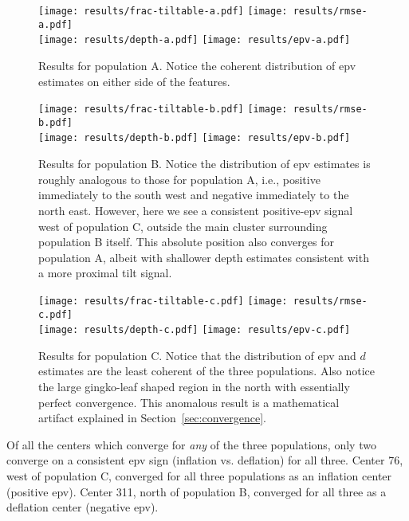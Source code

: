 \begin{figure}
    \texttt{[image: results/frac-tiltable-a.pdf]}%
    \texttt{[image: results/rmse-a.pdf]}\\
    \texttt{[image: results/depth-a.pdf]}%
    \texttt{[image: results/epv-a.pdf]}%
    \caption[Pop. A]{Results for population A. Notice the coherent distribution of \acs{epv} estimates on either side of the features.}%
    \label{fig:results-a}
\end{figure}

\begin{figure}
    \texttt{[image: results/frac-tiltable-b.pdf]}%
    \texttt{[image: results/rmse-b.pdf]}\\
    \texttt{[image: results/depth-b.pdf]}%
    \texttt{[image: results/epv-b.pdf]}%
    \caption[Pop. B]{Results for population B. Notice the distribution of \acs{epv} estimates is roughly analogous to those for population A, i.e., positive immediately to the south west and negative immediately to the north east. However, here we see a consistent positive-\acs{epv} signal west of population C, outside the main cluster surrounding population B itself. This absolute position also converges for population A, albeit with shallower depth estimates consistent with a more proximal tilt signal.}%
    \label{fig:results-b}
\end{figure}

\begin{figure}
    \texttt{[image: results/frac-tiltable-c.pdf]}%
    \texttt{[image: results/rmse-c.pdf]}\\
    \texttt{[image: results/depth-c.pdf]}%
    \texttt{[image: results/epv-c.pdf]}%
    \caption[Pop. C]{Results for population C. Notice that the distribution of \acs{epv} and $d$ estimates are the least coherent of the three populations. Also notice the large gingko-leaf shaped region in the north with essentially perfect convergence. This anomalous result is a mathematical artifact explained in Section~\ref{sec:convergence}.}%
    \label{fig:results-c}
\end{figure}

Of all the centers which converge for \emph{any} of the three populations, only two converge on a consistent \acs{epv} sign (inflation vs. deflation) for all three. Center 76, west of population C, converged for all three populations as an inflation center (positive \acs{epv}). Center 311, north of population B, converged for all three as a deflation center (negative \acs{epv}).

